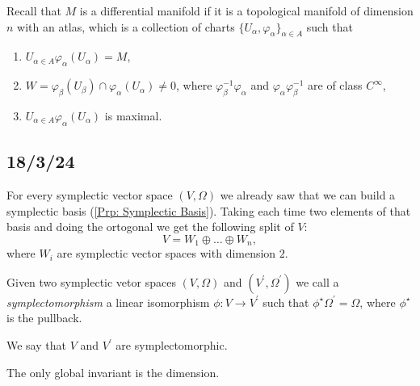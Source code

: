 \documentclass[misc]{subfiles}
\begin{document}
\begin{Rmk}\label{Rmk: Differentiable manifold}
    Recall that $M$ is a differential manifold if it is a topological manifold of dimension $n$ with an atlas, which is a collection of charts $\{U_\alpha,\varphi_\alpha\}_{\alpha\in A}$ such that
    \begin{enumerate}[label=\RmkLbl]

        \item $U_{\alpha\in A} \varphi_\alpha(U_\alpha) = M$,

        \item $W = \varphi_\beta(U_\beta)\cap\varphi_\alpha(U_\alpha)\neq 0$, where $\varphi_\beta^{-1}\varphi_\alpha$ and $\varphi_\alpha\varphi_\beta^{-1}$ are of class $C^\infty$,

        \item $U_{\alpha\in A} \varphi_\alpha(U_\alpha)$ is maximal.
    \end{enumerate}
\end{Rmk}

\begin{Exp}\label{Exp: Differentiable manifolds}
\end{Exp}

\subsection*{18/3/24}\label{Sec: 18/3/24}

\begin{Rmk}
    For every symplectic vector space $(V,\Omega)$ we already saw that we can build a symplectic basis (\ref{Prp: Symplectic Basis}). Taking each time two elements of that basis and doing the ortogonal we get the following split of $V$:
    \[
        V=W_1 \oplus \dots \oplus W_n,
    \]
    where $W_i$ are symplectic vector spaces with dimension $2$.
\end{Rmk}

\begin{Dfn}
    Given two symplectic vetor spaces $(V,\Omega)$ and $(V^\prime,\Omega^\prime)$ we call a \emph{symplectomorphism} a linear isomorphism $\phi: V \rightarrow V^\prime$ such that $\phi^\star\Omega^\prime=\Omega$, where $\phi^\star$ is the pullback.

    We say that $V$ and $V^\prime$ are symplectomorphic.
\end{Dfn}

\begin{Prp}
    The only global invariant is the dimension.
\end{Prp}
\end{document}
